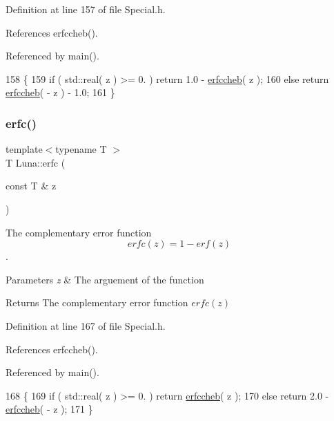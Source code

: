 Definition at line 157 of file Special.\+h.



References erfccheb().



Referenced by main().


\begin{DoxyCode}
158     \{
159       \textcolor{keywordflow}{if} ( std::real( z ) >= 0. ) \textcolor{keywordflow}{return} 1.0 - \hyperlink{namespaceLuna_ac9674d093d4c75954df962781acf9150}{erfccheb}( z );
160       \textcolor{keywordflow}{else} \textcolor{keywordflow}{return} \hyperlink{namespaceLuna_ac9674d093d4c75954df962781acf9150}{erfccheb}( - z ) - 1.0;
161     \}
\end{DoxyCode}
\mbox{\label{namespaceLuna_aa9ceeb6a99e1f82aa1d4614bcc9653be}} 
\subsubsection{\texorpdfstring{erfc()}{erfc()}}
{\footnotesize\ttfamily template$<$typename T $>$ \\
T Luna\+::erfc (\begin{DoxyParamCaption}\item[{const T \&}]{z }\end{DoxyParamCaption})}



The complementary error function \[ erfc(z) = 1 - erf(z) \]. 


\begin{DoxyParams}{Parameters}
{\em z} & The arguement of the function \\
\hline
\end{DoxyParams}
\begin{DoxyReturn}{Returns}
The complementary error function $ erfc(z) $ 
\end{DoxyReturn}


Definition at line 167 of file Special.\+h.



References erfccheb().



Referenced by main().


\begin{DoxyCode}
168     \{
169       \textcolor{keywordflow}{if} ( std::real( z ) >= 0. ) \textcolor{keywordflow}{return} \hyperlink{namespaceLuna_ac9674d093d4c75954df962781acf9150}{erfccheb}( z );
170       \textcolor{keywordflow}{else} \textcolor{keywordflow}{return} 2.0 - \hyperlink{namespaceLuna_ac9674d093d4c75954df962781acf9150}{erfccheb}( - z );
171     \}
\end{DoxyCode}
\mbox{\label{namespaceLuna_ac9674d093d4c75954df962781acf9150}} 
